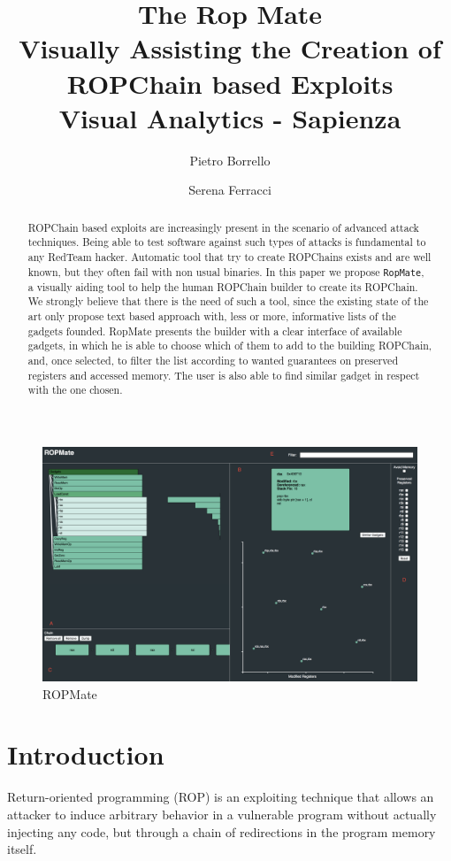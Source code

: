 \documentclass[twocolumn, 11pt]{article}
\title{{\Large \bf The Rop Mate \\ \large Visually Assisting the Creation of ROPChain based Exploits}  \\{\medskip\normalfont\normalsize  Visual Analytics -  Sapienza}}
\author{
{\rm Pietro Borrello}
\and
{\rm Serena Ferracci}}
\date{}
\begin{document}
    \maketitle
    \begin{figure}[htb]
      \centering
      \includegraphics[width=0.9\linewidth]{ropmate-screen}
      \caption{ROPMate}\label{fig:ropmate}
    \end{figure}

\begin{abstract}

ROPChain based exploits are increasingly present in the scenario of advanced attack techniques.
Being able to test software against such types of attacks is fundamental to any RedTeam hacker. Automatic tool that try to create ROPChains exists and are well known, but they often fail with non usual binaries.
In this paper we propose \texttt{RopMate}, a visually aiding tool to help the human ROPChain builder to create its ROPChain. We strongly believe that there is the need of such a tool, since the existing state of the art only propose text based approach with, less or more, informative lists of the gadgets founded.
RopMate presents the builder with a clear interface of available gadgets, in which he is able to choose which of them to add to the building ROPChain, and, once selected, to filter the list according to wanted guarantees on preserved registers and accessed memory. The user is also able to find similar gadget in respect with the one chosen.
\end{abstract}

\twocolumn
\section{Introduction}
Return-oriented programming (ROP) is an exploiting technique that allows an attacker to induce arbitrary behavior in a vulnerable program without actually injecting any code, but through a chain of redirections in the program memory itself. \cite{rop}
\end{document}
